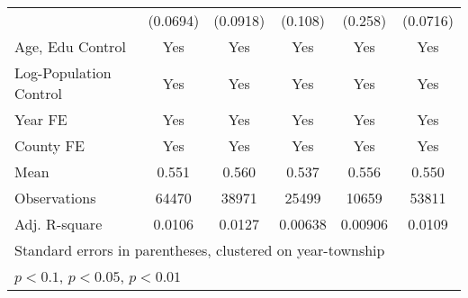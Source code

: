 \begin{table}
{{\begin{tabular}{l*{5}{c}}
                                                        & (\num{0.0694})                        & (\num{0.0918})                        & (\num{0.108})                    & (\num{0.258})                   & (\num{0.0716})                      \\
                Age, Edu Control                        & Yes                             & Yes                             & Yes                        & Yes                       & Yes                           \\
                Log-Population Control                  & Yes                             & Yes                             & Yes                        & Yes                       & Yes                           \\
                Year FE                                 & Yes                             & Yes                             & Yes                        & Yes                       & Yes                           \\
                County FE                               & Yes                             & Yes                             & Yes                        & Yes                       & Yes                           \\
                \midrule
                Mean                                    & \num{0.551}                           & \num{0.560}                           & \num{0.537}                      & \num{0.556}                     & \num{0.550}                         \\
                Observations                            & \num{64470}                           & \num{38971}                           & \num{25499}                      & \num{10659}                     & \num{53811}                         \\
                Adj. R-square                           & \num{0.0106}                          & \num{0.0127}                          & \num{0.00638}                    & \num{0.00906}                   & \num{0.0109}                        \\
                \bottomrule
                \multicolumn{6}{l}{\footnotesize Standard errors in parentheses, clustered on year-township}                                                                                                                                     \\
                \multicolumn{6}{l}{\footnotesize \sym{*} \(p<0.1\), \sym{**} \(p<0.05\), \sym{***} \(p<0.01\)}                                                                                                       \\
            \end{tabular}
        }
    }
\end{table}